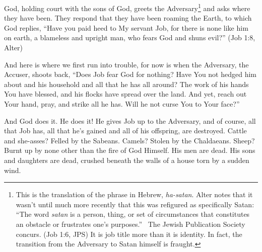 God, holding court with the sons of God, greets the Adversary\footnote{This is the translation of the phrase in Hebrew, \emph{ha-satan}. Alter notes that it wasn't until much more recently that this was refigured as specifically Satan: ``The word \emph{satan} is a person, thing, or set of circumstances that constitutes an obstacle or frustrates one's purposes.''\footnotemark~\parencite[466]{alter} The Jewish Publication Society concurs. (Job 1:6, JPS) It is job title more than it is identity. In fact, the transition from the Adversary to Satan himself is fraught.\footnotemark\setcounter{footnote}{4}} and asks where they have been. They respond that they have been roaming the Earth, to which God replies, ``Have you paid heed to My servant Job, for there is none like him on earth, a blameless and upright man, who fears God and shuns evil?'' (Job 1:8, Alter)

And here is where we first run into trouble, for now is when the Adversary, the Accuser, shoots back, ``Does Job fear God for nothing? Have You not hedged him about and his household and all that he has all around? The work of his hands You have blessed, and his flocks have spread over the land. And yet, reach out Your hand, pray, and strike all he has. Will he not curse You to Your face?''

And God does it. He does it! He gives Job up to the Adversary, and of course, all that Job has, all that he's gained and all of his offspring, are destroyed. Cattle and she-asses? Felled by the Sabeans. Camels? Stolen by the Chaldaeans. Sheep? Burnt up by none other than the fire of God Himself. His men are dead. His sons and daughters are dead, crushed beneath the walls of a house torn by a sudden wind.


